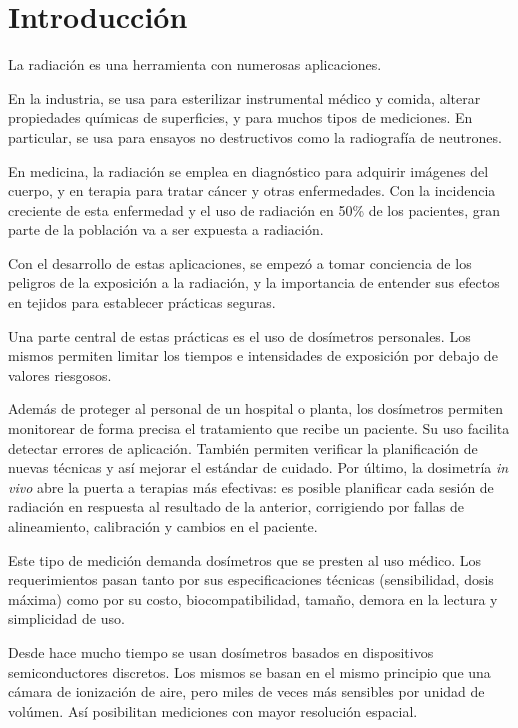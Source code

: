 \section{Introducción}
La radiación es una herramienta con numerosas aplicaciones.

En la industria, se usa para esterilizar instrumental médico y comida,
alterar propiedades químicas de superficies\cite{clough_high},
y para muchos tipos de mediciones.
En particular, se usa para ensayos no destructivos
como la radiografía de neutrones\cite{berger_neutron_1960}.

En medicina, la radiación se emplea en diagnóstico para adquirir imágenes del cuerpo,
y en terapia para tratar cáncer y otras enfermedades.
Con la incidencia creciente de esta enfermedad 
y el uso de radiación en 50\% de los
pacientes\cite{symposium_assurance_dosimetry_1994},
gran parte de la población va a ser expuesta a radiación.

Con el desarrollo de estas aplicaciones,
se empezó a tomar conciencia de 
los peligros de la exposición a la radiación,
y la importancia de entender sus efectos en tejidos
para establecer prácticas seguras.

Una parte central de estas prácticas es el uso de dosímetros personales.
Los mismos permiten limitar los tiempos e intensidades de exposición
por debajo de valores riesgosos.

Además de proteger al personal de un hospital o planta,
los dosímetros permiten monitorear de forma precisa 
el tratamiento que recibe un paciente.
Su uso facilita detectar errores de aplicación\cite{noel_detection_1995}.
También permiten verificar la planificación de nuevas
técnicas y así mejorar el estándar de cuidado\cite{essers_vivo_1999}.
Por último, la dosimetría \emph{in vivo} 
abre la puerta a terapias más efectivas:
es posible planificar cada sesión de radiación
en respuesta al resultado de la anterior,
corrigiendo por fallas de alineamiento, calibración 
y cambios en el paciente\cite{wu_application_2006}.

Este tipo de medición demanda dosímetros 
que se presten al uso médico.
Los requerimientos pasan tanto por sus especificaciones técnicas
(sensibilidad, dosis máxima)
como por su costo,
biocompatibilidad, tamaño,
demora en la lectura y simplicidad de uso.

Desde hace mucho tiempo se usan dosímetros basados en 
dispositivos semiconductores discretos.
Los mismos se basan en el mismo principio que una cámara de ionización de aire,
pero miles de veces más sensibles por unidad de volúmen\cite{jones_application_1963}.
Así posibilitan mediciones con mayor resolución espacial.

